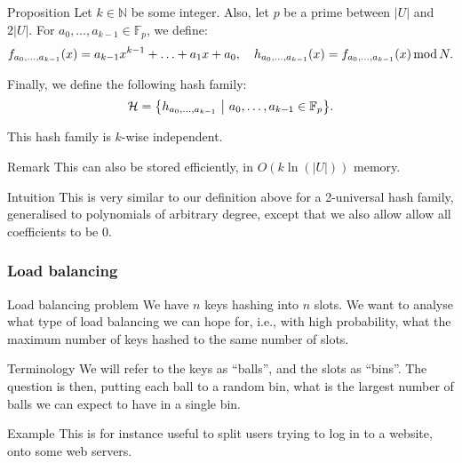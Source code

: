 \documentclass[a4paper]{article}
\begin{document}
\begin{parag}{Proposition}
    Let $k \in \mathbb{N}$ be some integer. Also, let $p$ be a prime between $\left|U\right|$ and $2\left|U\right|$. For $a_0, \ldots, a_{k-1} \in \mathbb{F}_p$, we define: 
    \[f_{a_0, \ldots, a_{k-1}}\left(x\right) = a_{k-1}x^{k-1} + \ldots + a_1 x + a_0, \mathspace h_{a_0, \ldots, a_{k-1}}\left(x\right) = f_{a_0, \ldots, a_{k-1}}\left(x\right) \Mod N.\]
   
    Finally, we define the following hash family: 
    \[\mathcal{H} = \left\{h_{a_0, \ldots, a_{k-1}} \suchthat a_0, \ldots, a_{k-1} \in \mathbb{F}_p\right\}.\]
    
    This hash family is $k$-wise independent.

    \begin{subparag}{Remark}
        This can also be stored efficiently, in $O\left(k\ln\left(\left|U\right|\right)\right)$ memory.
    \end{subparag}

    \begin{subparag}{Intuition}
        This is very similar to our definition above for a 2-universal hash family, generalised to polynomials of arbitrary degree, except that we also allow allow all coefficients to be $0$.
    \end{subparag}
\end{parag}

\subsubsection{Load balancing}

\begin{parag}{Load balancing problem}
    We have $n$ keys hashing into $n$ slots. We want to analyse what type of load balancing we can hope for, i.e., with high probability, what the maximum number of keys hashed to the same number of slots.

    \begin{subparag}{Terminology}
        We will refer to the keys as ``balls'', and the slots as ``bins''. The question is then, putting each ball to a random bin, what is the largest number of balls we can expect to have in a single bin. 
    \end{subparag}

    \begin{subparag}{Example}
        This is for instance useful to split users trying to log in to a website, onto some web servers.
    \end{subparag}
\end{parag}
\end{document}
